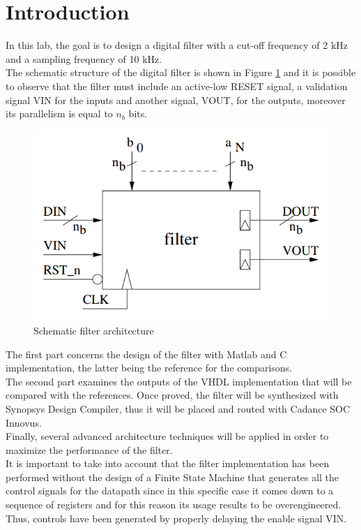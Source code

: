 \documentclass[a4paper, titlepage]{article}
\begin{document}
\section{Introduction}
In this lab, the goal is to design a digital filter with a cut-off frequency of 2 kHz and a sampling frequency of 10 kHz.\\The schematic structure of the digital filter is shown in Figure \ref{fig:filt_arch} and it is possible to observe that the filter must include an active-low RESET signal, a validation signal VIN for the inputs and another signal, VOUT, for the outputs, moreover its parallelism is equal to $n_{b}$ bits.
 \begin{figure} [h]
\centering
	\includegraphics[scale=0.6]{filt_arch.PNG}
	\caption{Schematic filter architecture}
	\label{fig:filt_arch}
\end{figure}
\newline The first part concerns the design of the filter with Matlab and C implementation, the latter being the reference for the comparisons.\\The second part examines the outputs of the VHDL implementation that will be compared with the references. Once proved, the filter will be synthesized with Synopsys Design Compiler, thus it will be placed and routed with Cadance SOC Innovus.\\
Finally, several advanced architecture techniques will be applied in order to maximize the performance of the filter.\\
It is important to take into account that the filter implementation has been performed without the design of a Finite State Machine that generates all the control signals for the datapath since in this specific case it comes down to a sequence of registers and for this reason its usage results to be overengineered.\\
Thus, controls have been generated by properly delaying the enable signal VIN.
 
\end{document}
